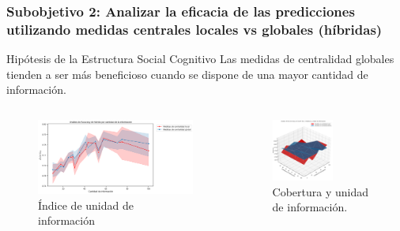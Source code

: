 \documentclass{beamer}
\begin{document}
\begin{frame}
	\frametitle{Subobjetivo 2: Analizar la eficacia de las predicciones utilizando medidas centrales  locales vs globales (híbridas)}
\begin{block}{Hipótesis de la Estructura Social Cognitivo }
	Las medidas de centralidad globales tienden a ser más beneficioso cuando se dispone de una mayor cantidad de información.
\end{block}
			\begin{columns}[c]
		\begin{column}{.5\textwidth}
			\begin{figure}
				\centering
				\includegraphics[width=1\textwidth]{figs/cap7/figura_45}
				\caption{Índice de unidad de información}
			\end{figure}      
		\end{column}
		\begin{column}{.5\textwidth}
			\begin{figure}
				\centering
				\includegraphics[width=0.6\textwidth]{figs/cap7/figura_46}
			\caption{Cobertura y unidad de información.}
			\end{figure}
		\end{column}
	\end{columns}
	
	
	
\end{frame}
\end{document}
